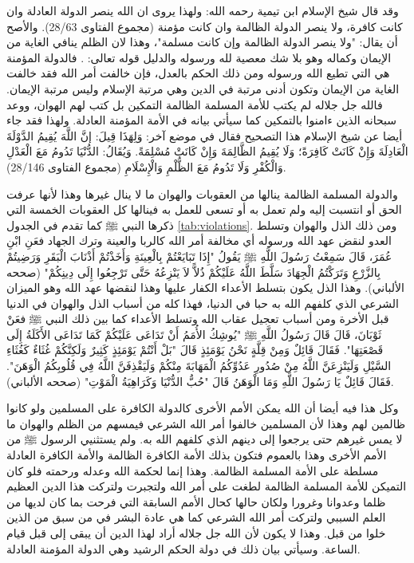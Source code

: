 وقد قال شيخ الإسلام ابن تيمية رحمه الله: ولهذا يروى ان الله ينصر الدولة العادلة وان كانت كافرة، ولا ينصر الدولة الظالمة وان كانت مؤمنة {\footnotesize (مجموع الفتاوى 28/63)}. والأصح أن يقال: "ولا ينصر الدولة الظالمة وإن كانت مسلمة"، وهذا لان الظلم ينافي الغاية من الإيمان وكماله وهو بلا شك معصية لله ورسوله والدليل قوله تعالى: \quranayah*[49][14]{\footnotesize \surahname*[49]}. فالدولة المؤمنة هي التي تطيع الله ورسوله ومن ذلك الحكم بالعدل، فإن خالفت أمر الله فقد خالفت الغاية من الإيمان وتكون أدنى مرتبة في الدين وهي مرتبة الإسلام وليس مرتبة الإيمان. فالله جل جلاله لم يكتب للأمة المسلمة الظالمة التمكين  بل كتب لهم الهوان، ووعد سبحانه الذين ءامنوا بالتمكين كما سيأتي بيانه في الأمة المؤمنة العادلة. ولهذا فقد جاء أيضا عن شيخ الإسلام هذا التصحيح فقال في موضع آخر: وَلِهَذَا قِيلَ: إنَّ اللَّهَ يُقِيمُ الدَّوْلَةَ الْعَادِلَةَ وَإِنْ كَانَتْ كَافِرَةً؛ وَلَا يُقِيمُ الظَّالِمَةَ وَإِنْ كَانَتْ مُسْلِمَةً. وَيُقَالُ: الدُّنْيَا تَدُومُ مَعَ الْعَدْلِ وَالْكُفْرِ وَلَا تَدُومُ مَعَ الظُّلْمِ وَالْإِسْلَامِ {\footnotesize (مجموع الفتاوى 28/146)}.

والدولة المسلمة الظالمة ينالها من العقوبات والهوان ما لا ينال غيرها وهذا لأنها عرفت الحق أو انتسبت إليه ولم تعمل به أو تسعى للعمل به فينالها كل العقوبات الخمسة التي ذكرها النبي ﷺ كما تقدم في الجدول \ref{tab:violations}. ومن ذلك الذل والهوان وتسلط العدو لنقض عهد الله ورسوله أي مخالفة أمر الله كالربا والعينة وترك الجهاد فعَنِ ابْنِ عُمَرَ، قَالَ سَمِعْتُ رَسُولَ اللَّهِ ﷺ يَقُولُ "إِذَا تَبَايَعْتُمْ بِالْعِينَةِ وَأَخَذْتُمْ أَذْنَابَ الْبَقَرِ وَرَضِيتُمْ بِالزَّرْعِ وَتَرَكْتُمُ الْجِهَادَ سَلَّطَ اللَّهُ عَلَيْكُمْ ذُلاًّ لاَ يَنْزِعُهُ حَتَّى تَرْجِعُوا إِلَى دِينِكُمْ" {\footnotesize (صححه الألباني)}. وهذا الذل يكون بتسلط الأعداء الكفار عليها وهذا لنقضها عهد الله وهو الميزان الشرعي الذي كلفهم الله به حبا في الدنيا، فهذا كله من أسباب الذل والهوان في الدنيا قبل الأخرة ومن أسباب تعجيل عقاب الله وتسلط الأعداء  كما بين ذلك النبي ﷺ فعَنْ ثَوْبَانَ، قَالَ قَالَ رَسُولُ اللَّهِ ﷺ "يُوشِكُ الأُمَمُ أَنْ تَدَاعَى عَلَيْكُمْ كَمَا تَدَاعَى الأَكَلَةُ إِلَى قَصْعَتِهَا". فَقَالَ قَائِلٌ وَمِنْ قِلَّةٍ نَحْنُ يَوْمَئِذٍ قَالَ "بَلْ أَنْتُمْ يَوْمَئِذٍ كَثِيرٌ وَلَكِنَّكُمْ غُثَاءٌ كَغُثَاءِ السَّيْلِ وَلَيَنْزِعَنَّ اللَّهُ مِنْ صُدُورِ عَدُوِّكُمُ الْمَهَابَةَ مِنْكُمْ وَلَيَقْذِفَنَّ اللَّهُ فِي قُلُوبِكُمُ الْوَهَنَ". فَقَالَ قَائِلٌ يَا رَسُولَ اللَّهِ وَمَا الْوَهَنُ قَالَ "حُبُّ الدُّنْيَا وَكَرَاهِيَةُ الْمَوْتِ" {\footnotesize (صححه الألباني)}. 

وكل هذا فيه أيضا أن الله يمكن الأمم الأخرى كالدولة الكافرة على المسلمين ولو كانوا ظالمين لهم وهذا لأن المسلمين خالفوا أمر الله الشرعي فيمسهم من الظلم والهوان ما لا يمس غيرهم حتى يرجعوا إلى دينهم الذي كلفهم الله به. ولم يستثنيي الرسول ﷺ من الأمم الأخرى وهذا بالعموم فتكون بذلك الأمة الكافرة الظالمة والأمة الكافرة العادلة مسلطة على الأمة المسلمة الظالمة. وهذا إنما لحكمة الله وعدله ورحمته فلو كان التميكن للأمة المسلمة الظالمة لطغت على أمر الله ولتجبرت ولتركت هذا الدين العظيم ظلما وعدوانا وغرورا ولكان حالها كحال الأمم السابقة التي فرحت بما كان لديها من العلم السببي  ولتركت أمر الله الشرعي كما هي عادة البشر في من سبق من الذين خلوا من قبل. وهذا لا يكون لأن الله جل جلاله أراد لهذا الدين أن يبقى إلى قبل قيام الساعة. وسيأتي بيان ذلك في دولة الحكم الرشيد وهي الدولة المؤمنة العادلة.

